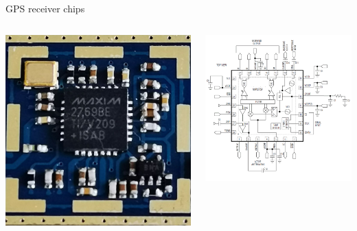 \documentclass[ignorenonframetext]{beamer}
\begin{document}
\begin{frame}{GPS receiver chips}
 \begin{columns}
  \begin{column}{0.4\linewidth}
    \includegraphics[width=\linewidth]{fig/max_2769.jpg}
  \end{column}
  \begin{column}{0.6\linewidth}
    \includegraphics[width=\linewidth]{fig/max_2769_schem.png}
  \end{column}
  \end{columns}
\end{frame}
\end{document}
